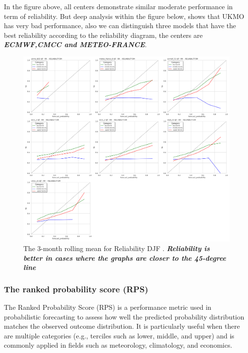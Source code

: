 In the figure above, all centers demonstrate similar moderate performance in term of reliability. But deep analysis within the figure below, shows that UKMO has very bad performance, also we can distinguish three models that have the best reliability according to the reliability diagram, the centers are \textbf{\textit{ECMWF,CMCC and METEO-FRANCE}}. 

\begin{figure}[H]
\centering
\includegraphics[scale=0.3]{plots/prob/rela/rela_diagram_RR_djf.png}
\caption{The 3-month rolling mean for Reliability DJF   . \textbf{\textit{Reliability is better in cases where the graphs are closer to the 45-degree line}}}
\end{figure}







\subsubsection{The ranked probability score (RPS)}

The Ranked Probability Score (RPS) is a performance metric used in probabilistic forecasting to assess how well the predicted probability distribution matches the observed outcome distribution. It is particularly useful when there are multiple categories (e.g., terciles such as lower, middle, and upper) and is commonly applied in fields such as meteorology, climatology, and economics.

